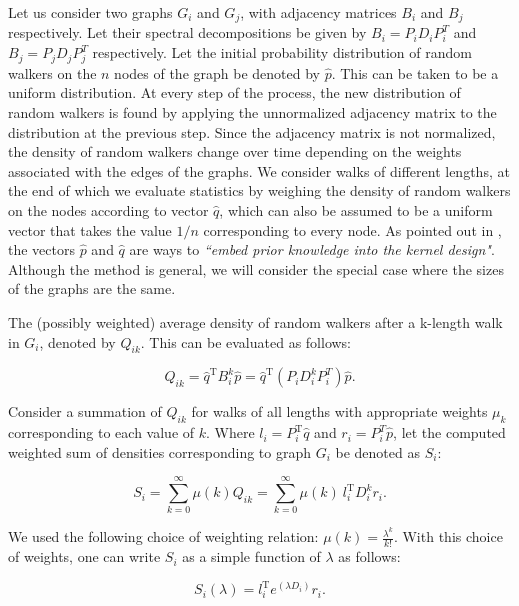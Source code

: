 Let us consider two graphs $G_i$ and $G_j$, with adjacency matrices
$B_i$ and $B_j$ respectively.
% 
Let their spectral decompositions be given by $B_i = P_i D_i P_i^{T}$
and $B_j = P_j D_j P_j^{T}$ respectively.
% 
% 
Let the initial probability distribution of random walkers on the $n$
nodes of the graph be denoted by $\hat{p}$.
% 
This can be taken to be a uniform distribution.
% 
At every step of the process, the new distribution of random walkers
is found by applying the unnormalized adjacency matrix to the
distribution at the previous step.
% 
Since the adjacency matrix is not normalized, the density of random
walkers change over time depending on the weights associated with the
edges of the graphs.
% 
We consider walks of different lengths, at the end of which we
evaluate statistics by weighing the density of random walkers on the
nodes according to vector $\hat{q}$, which can also be assumed to be a
uniform vector that takes the value $1/n$ corresponding to every node.
% 
As pointed out in \cite{vishwanathan_graph_2010}, the vectors $\hat{p}$ and
$\hat{q}$ are ways to \emph{``embed prior knowledge into the kernel
  design"}.
% 
Although the method is general, we will consider the special case
where the sizes of the graphs are the same.


The (possibly weighted) average density of random walkers after a
k-length walk in $G_i$, denoted by $Q_{ik}$.
% 
This can be evaluated as follows:

\begin{equation}
  Q_{ik} = \hat{q}^\mathrm{T}B_i^k \hat{p} = \hat{q}^\mathrm{T} (P_i D_i^k P_i^{T}) \hat{p}.
\end{equation}

Consider a summation of $Q_{ik}$ for walks of all lengths with
appropriate weights $\mu_k$ corresponding to each value of $k$.
% 
Where $l_i=P_i^\mathrm{T}\hat{q}$ and $r_i=P_i^{T} \hat{p}$, let the
computed weighted sum of densities corresponding to graph $G_i$ be
denoted as $S_i$:

\begin{equation}
  S_i = \sum_{k=0}^{\infty} \mu(k) Q_{ik} = \sum_{k=0}^{\infty} \mu(k)~l_i^\mathrm{T} D_i^k r_i.
\end{equation}

We used the following choice of weighting relation:
$\mu(k) = \frac{\lambda^k}{k!}$.
% 
With this choice of weights, one can write $S_i$ as a simple function
of $\lambda$ as follows:

\begin{equation}
  S_i(\lambda) = l_i^\mathrm{T}e^{(\lambda D_i)}r_i.
  \label{eq:S}
\end{equation}

